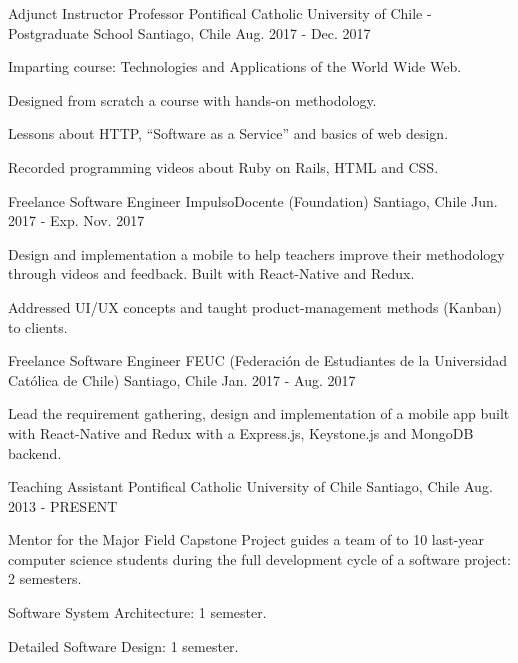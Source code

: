 \begin{cventries}
  \cventry
    {Adjunct Instructor Professor}
    {Pontifical Catholic University of Chile - Postgraduate School}
    {Santiago, Chile}
    {Aug. 2017 - Dec. 2017}
    {
      \begin{cvitems}
        \item {Imparting course: Technologies and Applications of the World Wide Web.}
        \item {Designed from scratch a course with hands-on methodology.}
        \item {Lessons about HTTP, ``Software as a Service'' and basics of web design.}
        \item {Recorded programming videos about Ruby on Rails, HTML and CSS.}
      \end{cvitems}
    }
  \cventry
    {Freelance Software Engineer}
    {ImpulsoDocente (Foundation)}
    {Santiago, Chile}
    {Jun. 2017 - Exp. Nov. 2017}
    {
      \begin{cvitems}
        \item {Design and implementation a mobile to help teachers improve their methodology through videos and feedback. Built with React-Native and Redux.}
        \item {Addressed UI/UX concepts and taught product-management methods (Kanban) to clients.}
      \end{cvitems}
    }
  \cventry
    {Freelance Software Engineer}
    {FEUC (Federación de Estudiantes de la Universidad Católica de Chile)}
    {Santiago, Chile}
    {Jan. 2017 - Aug. 2017}
    {
      \begin{cvitems}
        \item {Lead the requirement gathering, design and implementation of a mobile app built with React-Native and Redux with a Express.js, Keystone.js and MongoDB backend.}
      \end{cvitems}
    }
  \cventry
    {Teaching Assistant}
    {Pontifical Catholic University of Chile}
    {Santiago, Chile}
    {Aug. 2013 - PRESENT}
    {
      \begin{cvitems}
        \item {Mentor for the Major Field Capstone Project guides a team of to 10 last-year computer science students during the full development cycle of a software project: 2 semesters.}
        \item {Software System Architecture: 1 semester.}
        \item {Detailed Software Design: 1 semester.}

\end{cvitems}}
\end{cventries}
